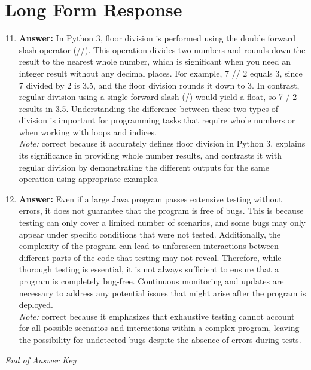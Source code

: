 \documentclass[12pt]{article}
\begin{document}
\section*{Long Form Response}
\begin{enumerate}[label=\arabic*.]
\setcounter{enumi}{10}
\item \textbf{Answer:} In Python 3, floor division is performed using the double forward slash operator (//). This operation divides two numbers and rounds down the result to the nearest whole number, which is significant when you need an integer result without any decimal places. For example, 7 // 2 equals 3, since 7 divided by 2 is 3.5, and the floor division rounds it down to 3. In contrast, regular division using a single forward slash (/) would yield a float, so 7 / 2 results in 3.5. Understanding the difference between these two types of division is important for programming tasks that require whole numbers or when working with loops and indices.
\\ \textit{Note:} correct because it accurately defines floor division in Python 3, explains its significance in providing whole number results, and contrasts it with regular division by demonstrating the different outputs for the same operation using appropriate examples.
\item \textbf{Answer:} Even if a large Java program passes extensive testing without errors, it does not guarantee that the program is free of bugs. This is because testing can only cover a limited number of scenarios, and some bugs may only appear under specific conditions that were not tested. Additionally, the complexity of the program can lead to unforeseen interactions between different parts of the code that testing may not reveal. Therefore, while thorough testing is essential, it is not always sufficient to ensure that a program is completely bug-free. Continuous monitoring and updates are necessary to address any potential issues that might arise after the program is deployed.
\\ \textit{Note:} correct because it emphasizes that exhaustive testing cannot account for all possible scenarios and interactions within a complex program, leaving the possibility for undetected bugs despite the absence of errors during tests.
\end{enumerate}

\vfill
\noindent\textit{End of Answer Key}
\end{document}
